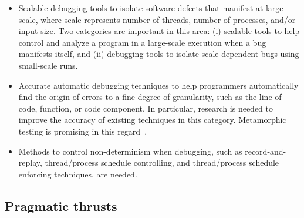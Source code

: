 \begin{itemize}
\item  Scalable debugging tools to isolate software defects that manifest at large scale, where scale represents number of threads, number of processes, and/or input size. Two categories are important in this area: (i) scalable tools to help control and analyze a program in a large-scale execution when a bug manifests itself, and (ii) debugging tools to isolate scale-dependent bugs using small-scale runs.

\item Accurate automatic debugging techniques to help programmers automatically find the origin of errors to a fine degree of granularity, such as the line of code, function, or code component. In particular, research is needed to improve the accuracy of existing techniques in this category. Metamorphic testing is promising in this regard~\cite{uplee-kanewala}.

\item Methods to control non-determinism when debugging, such as record-and-replay, thread/process schedule controlling, and thread/process schedule enforcing techniques, are needed.

\end{itemize}



\subsection{Pragmatic thrusts}

\label{sec:pragmatic-thrusts}

